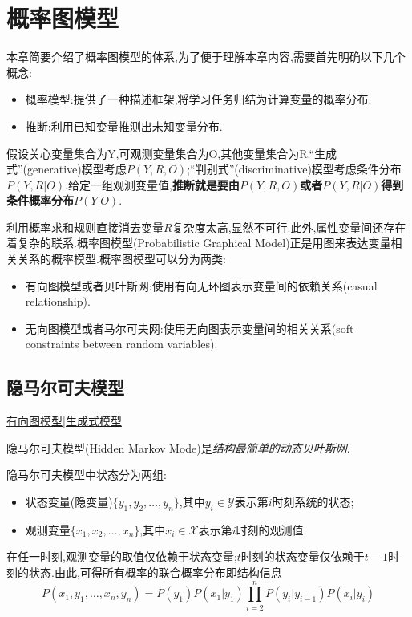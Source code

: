\chapter{概率图模型}

本章简要介绍了概率图模型的体系,为了便于理解本章内容,需要首先明确以下几个概念:
\begin{itemize}
\item 概率模型:提供了一种描述框架,将学习任务归结为计算变量的概率分布.
\item 推断:利用已知变量推测出未知变量分布.
\end{itemize}

假设关心变量集合为Y,可观测变量集合为O,其他变量集合为R.``生成式''(generative)模型考虑$P(Y,R,O)$;``判别式''(discriminative)模型考虑条件分布$P(Y,R|O)$.给定一组观测变量值,\textbf{推断就是要由$P(Y,R,O)$或者$P(Y,R|O)$得到条件概率分布$P(Y|O)$}.

利用概率求和规则直接消去变量$R$复杂度太高,显然不可行.此外,属性变量间还存在着复杂的联系.概率图模型(Probabilistic Graphical Model)正是用图来表达变量相关关系的概率模型.概率图模型可以分为两类:
\begin{itemize}
\item 有向图模型或者贝叶斯网:使用有向无环图表示变量间的依赖关系(casual relationship).
\item 无向图模型或者马尔可夫网:使用无向图表示变量间的相关关系(soft constraints between random variables).
\end{itemize}

\section{隐马尔可夫模型}
\underline{有向图模型|生成式模型}

隐马尔可夫模型(Hidden Markov Mode)是\textit{结构最简单的动态贝叶斯网}.

隐马尔可夫模型中状态分为两组:
\begin{itemize}
\item 状态变量(隐变量)$\{y_1,y_2,\dots,y_n\}$,其中$y_i\in\mathcal Y$表示第$i$时刻系统的状态;
\item 观测变量$\{x_1,x_2,\dots,x_n\}$,其中$x_i\in\mathcal X$表示第$i$时刻的观测值.
\end{itemize}

在任一时刻,观测变量的取值仅依赖于状态变量;$t$时刻的状态变量仅依赖于$t-1$时刻的状态.由此,可得所有概率的联合概率分布即结构信息
\begin{equation}
P(x_1,y_1,\dots,x_n,y_n)=P(y_1)P(x_1|y_1)\prod_{i=2}^nP(y_i|y_{i-1})P(x_i|y_i)
\end{equation}

